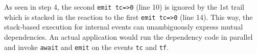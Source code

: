 \documentclass{acm_proc_article-sp}
\newcommand{\code}[1] {{\small{\texttt{#1}}}}
\newcommand{\1}{\;}
\newcommand{\2}{\;\;}
\newcommand{\3}{\;\;\;}
\newcommand{\5}{\;\;\;\;\;}
\begin{document}
%
As seen in step 4, the second \code{emit tc=>0} (line 10) is ignored by the 1st 
trail which is stacked in the reaction to the first \code{emit tc=>0} (line 
14).
%
This way, the stack-based execution for internal events can unambiguously 
express mutual dependencies.
%
%
An actual application would run the dependency code in parallel and invoke
\code{await} and \code{emit} on the events \code{tc} and \code{tf}.

\end{document}
